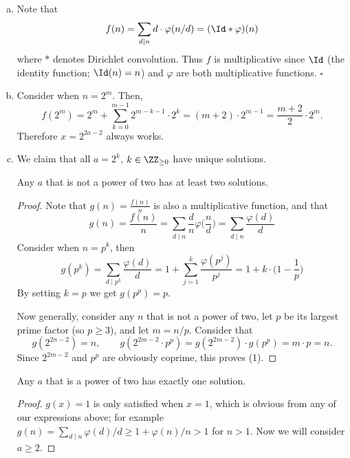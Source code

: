 \begin{solution}[Ritwin]\phantom{}
    \begin{enumerate}[(a)]
        \item Note that \[f(n) = \sum_{d \mid n} d \cdot \varphi(n/d) = (\Id * \varphi)(n)\]
        where $*$ denotes Dirichlet convolution. Thus $f$ is multiplicative
        since $\Id$ (the identity function; $\Id(n) = n$) and $\varphi$ are
        both multiplicative functions. $\square$
        
        \item Consider when $n = 2^m$. Then,
        \[f(2^m) = 2^m + \sum_{k=0}^{m-1} 2^{m-k-1} \cdot 2^k = (m+2) \cdot 2^{m-1} = \frac{m+2}{2} \cdot 2^m.\]
        Therefore $x = 2^{2a-2}$ always works.
        
        \item We claim that all $a = 2^k$, $k \in \ZZ_{\geq0}$ have unique solutions.
        
        \begin{claim*}[1]
            Any $a$ that is not a power of two has at least two solutions.
        \end{claim*}
        \begin{proof}
            Note that $g(n) = \frac{f(n)}{n}$ is also a multiplicative function, and that
            \[g(n) = \frac{f(n)}{n} = \sum_{d \mid n} \frac{d}{n} \varphi\bigg(\frac{n}{d}\bigg) = \sum_{d \mid n} \frac{\varphi(d)}{d}\] Consider when $n = p^k$, then \[g(p^k) = \sum_{d \mid p^k} \frac{\varphi(d)}{d} = 1 + \sum_{j=1}^k \frac{\varphi(p^j)}{p^j} = 1 + k \cdot \bigg(1 - \frac{1}{p}\bigg)\]
            By setting $k=p$ we get $g(p^p) = p$.
            
            Now generally, consider any $n$ that is not a power of two, let $p$ be
            its largest prime factor (so $p \geq 3$), and let $m = n/p$. Consider that
            \[g(2^{2n-2}) = n, \qquad g(2^{2m-2} \cdot p^p) = g(2^{2m-2}) \cdot g(p^p) = m \cdot p = n.\]
            Since $2^{2m-2}$ and $p^p$ are obviously coprime, this proves (1).
        \end{proof}
        
        \begin{claim*}[2]
            Any $a$ that is a power of two has exactly one solution.
        \end{claim*}
        \begin{proof}
            $g(x) = 1$ is only satisfied when $x = 1$, which is obvious from any of
            our expressions above; for example $g(n) = \sum_{d \mid n} \varphi(d)/d \geq 1 + \varphi(n)/n > 1$
            for $n > 1$. Now we will consider $a \geq 2$.
            

\end{proof}
\end{enumerate}
\end{solution}
